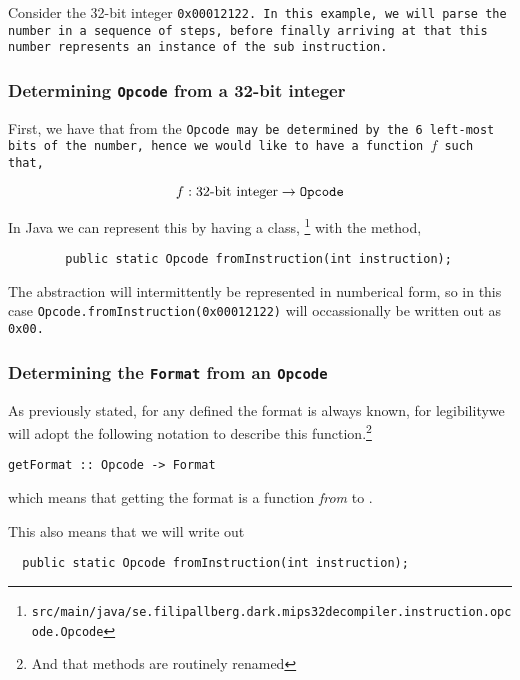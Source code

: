 Consider the 32-bit integer \tt{0x00012122}. In this example, we
will parse the number in a sequence of steps, before finally arriving
at that this number represents an instance of the \tt{sub}
instruction.

\subsubsection{Determining \texttt{Opcode} from a 32-bit integer}
First, we have that from the \tt{Opcode} may be determined
by the 6 left-most bits of the number, hence we would like to
have a function $f$ such that,

\begin{equation*}
        f: \textrm{32-bit integer} \to \tt{Opcode}
\end{equation*}

In Java we can represent this by having a class, \opcodem\footnote{
\tt{src/main/java/se.filipallberg.dark.mips32decompiler.instruction.opcode.Opcode}}
with the method,

\begin{verbatim}
        public static Opcode fromInstruction(int instruction);
\end{verbatim}

The \opcodem abstraction will intermittently be represented in
numberical form, so in this case \texttt{Opcode.fromInstruction(0x00012122)}
will occassionally be written out as \tt{0x00}.

\subsubsection{Determining the \texttt{Format} from an \texttt{Opcode}}

As previously stated, for any defined \opcodem the
format is always known, for legibilitywe will adopt the following
notation to describe this function.\footnote{And that methods are
routinely renamed}

\begin{verbatim}
getFormat :: Opcode -> Format
\end{verbatim}

which means that getting the format is a function \emph{from} \opcodem
to \formatm.

This also means that we will write out

\begin{verbatim}
  public static Opcode fromInstruction(int instruction);
\end{verbatim}

